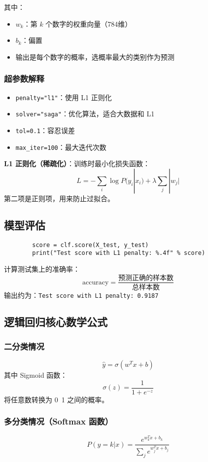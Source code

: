 \documentclass[UTF8]{ctexart}
\begin{document}
	其中：
	\begin{itemize}
		\item $w_k$：第 $k$ 个数字的权重向量（784维）
		\item $b_k$：偏置
		\item 输出是每个数字的概率，选概率最大的类别作为预测
	\end{itemize}
	
	\subsubsection{超参数解释}
	\begin{itemize}
		\item \texttt{penalty="l1"}：使用 L1 正则化
		\item \texttt{solver="saga"}：优化算法，适合大数据和 L1
		\item \texttt{tol=0.1}：容忍误差
		\item \texttt{max\_iter=100}：最大迭代次数
	\end{itemize}
	
	\textbf{L1 正则化（稀疏化）}：训练时最小化损失函数：
	\[
	L = -\sum_i \log P(y_i | x_i) + \lambda \sum_j |w_j|
	\]
	第二项是正则项，用来防止过拟合。
	
	\subsection{模型评估}
	\begin{lstlisting}
		score = clf.score(X_test, y_test)
		print("Test score with L1 penalty: %.4f" % score)
	\end{lstlisting}
	
	计算测试集上的准确率：
	\[
	\text{accuracy} = \frac{\text{预测正确的样本数}}{\text{总样本数}}
	\]
	输出约为：\texttt{Test score with L1 penalty: 0.9187}
	
	\subsection{逻辑回归核心数学公式}
	\subsubsection{二分类情况}
	\[
	\hat{y} = \sigma(w^T x + b)
	\]
	其中 Sigmoid 函数：
	\[
	\sigma(z) = \frac{1}{1 + e^{-z}}
	\]
	将任意数转换为 0~1 之间的概率。
	
	\subsubsection{多分类情况（Softmax 函数）}
	\[
	P(y=k|x) = \frac{e^{w_k^T x + b_k}}{\sum_{j} e^{w_j^T x + b_j}}
	\]
	
\end{document}
